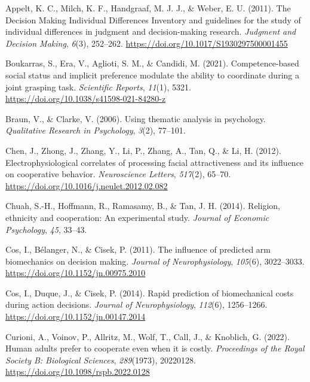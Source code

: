 \documentclass[
  man,
  floatsintext,
  longtable,
  nolmodern,
  notxfonts,
  notimes,
  mask,
  colorlinks=true,linkcolor=blue,citecolor=blue,urlcolor=blue]{apa7}
\newlength{\cslhangindent}
\newenvironment{CSLReferences}[2] %
 {\begin{list}{}{%
  \setlength{\itemindent}{0pt}
  \setlength{\leftmargin}{0pt}
  \setlength{\parsep}{0pt}
  \ifodd #1
   \setlength{\leftmargin}{\cslhangindent}
   \setlength{\itemindent}{-1\cslhangindent}
  \fi
  \setlength{\itemsep}{#2\baselineskip}}}
 {\end{list}}
\begin{document}
\label{refs}
\begin{CSLReferences}{1}{0}
Appelt, K. C., Milch, K. F., Handgraaf, M. J. J., \& Weber, E. U.
(2011). The {Decision Making Individual Differences Inventory} and
guidelines for the study of individual differences in judgment and
decision-making research. \emph{Judgment and Decision Making},
\emph{6}(3), 252--262. \url{https://doi.org/10.1017/S1930297500001455}

Boukarras, S., Era, V., Aglioti, S. M., \& Candidi, M. (2021).
Competence-based social status and implicit preference modulate the
ability to coordinate during a joint grasping task. \emph{Scientific
Reports}, \emph{11}(1), 5321.
\url{https://doi.org/10.1038/s41598-021-84280-z}

Braun, V., \& Clarke, V. (2006). Using thematic analysis in psychology.
\emph{Qualitative Research in Psychology}, \emph{3}(2), 77--101.

Chen, J., Zhong, J., Zhang, Y., Li, P., Zhang, A., Tan, Q., \& Li, H.
(2012). Electrophysiological correlates of processing facial
attractiveness and its influence on cooperative behavior.
\emph{Neuroscience Letters}, \emph{517}(2), 65--70.
\url{https://doi.org/10.1016/j.neulet.2012.02.082}

Chuah, S.-H., Hoffmann, R., Ramasamy, B., \& Tan, J. H. (2014).
Religion, ethnicity and cooperation: {An} experimental study.
\emph{Journal of Economic Psychology}, \emph{45}, 33--43.

Cos, I., Bélanger, N., \& Cisek, P. (2011). The influence of predicted
arm biomechanics on decision making. \emph{Journal of Neurophysiology},
\emph{105}(6), 3022--3033. \url{https://doi.org/10.1152/jn.00975.2010}

Cos, I., Duque, J., \& Cisek, P. (2014). Rapid prediction of
biomechanical costs during action decisions. \emph{Journal of
Neurophysiology}, \emph{112}(6), 1256--1266.
\url{https://doi.org/10.1152/jn.00147.2014}

Curioni, A., Voinov, P., Allritz, M., Wolf, T., Call, J., \& Knoblich,
G. (2022). Human adults prefer to cooperate even when it is costly.
\emph{Proceedings of the Royal Society B: Biological Sciences},
\emph{289}(1973), 20220128. \url{https://doi.org/10.1098/rspb.2022.0128}


\end{CSLReferences}
\end{document}
